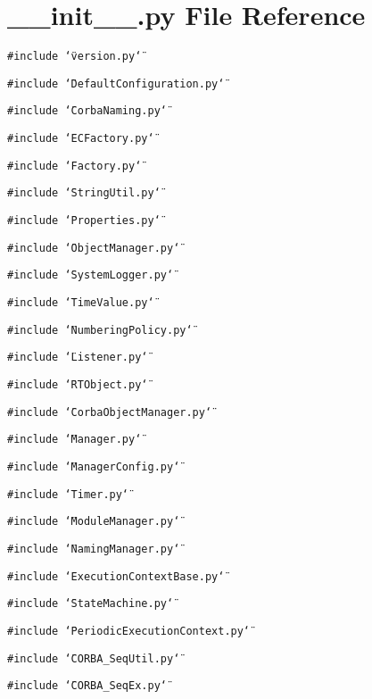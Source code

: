\section{\_\-\_\-init\_\-\_\-.py File Reference}
\label{____init_____8py}
{\tt \#include \char`\"{}version.py\char`\"{}}\par
{\tt \#include \char`\"{}Default\-Configuration.py\char`\"{}}\par
{\tt \#include \char`\"{}Corba\-Naming.py\char`\"{}}\par
{\tt \#include \char`\"{}ECFactory.py\char`\"{}}\par
{\tt \#include \char`\"{}Factory.py\char`\"{}}\par
{\tt \#include \char`\"{}String\-Util.py\char`\"{}}\par
{\tt \#include \char`\"{}Properties.py\char`\"{}}\par
{\tt \#include \char`\"{}Object\-Manager.py\char`\"{}}\par
{\tt \#include \char`\"{}System\-Logger.py\char`\"{}}\par
{\tt \#include \char`\"{}Time\-Value.py\char`\"{}}\par
{\tt \#include \char`\"{}Numbering\-Policy.py\char`\"{}}\par
{\tt \#include \char`\"{}Listener.py\char`\"{}}\par
{\tt \#include \char`\"{}RTObject.py\char`\"{}}\par
{\tt \#include \char`\"{}Corba\-Object\-Manager.py\char`\"{}}\par
{\tt \#include \char`\"{}Manager.py\char`\"{}}\par
{\tt \#include \char`\"{}Manager\-Config.py\char`\"{}}\par
{\tt \#include \char`\"{}Timer.py\char`\"{}}\par
{\tt \#include \char`\"{}Module\-Manager.py\char`\"{}}\par
{\tt \#include \char`\"{}Naming\-Manager.py\char`\"{}}\par
{\tt \#include \char`\"{}Execution\-Context\-Base.py\char`\"{}}\par
{\tt \#include \char`\"{}State\-Machine.py\char`\"{}}\par
{\tt \#include \char`\"{}Periodic\-Execution\-Context.py\char`\"{}}\par
{\tt \#include \char`\"{}CORBA\_\-Seq\-Util.py\char`\"{}}\par
{\tt \#include \char`\"{}CORBA\_\-Seq\-Ex.py\char`\"{}}\par
